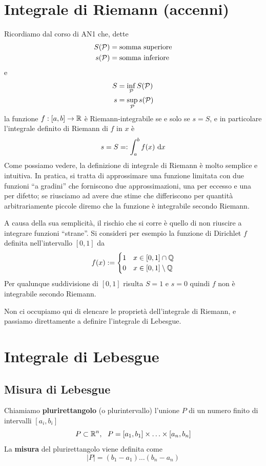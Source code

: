 \section{Integrale di Riemann (accenni)}

Ricordiamo dal corso di AN1 che, dette 
\begin{align*}
S(\mathcal{P})&=\text{somma superiore}\\
s(\mathcal{P})&=\text{somma inferiore}
\end{align*}
e
\begin{align*}
S&=\inf_{\mathcal{P}}S(\mathcal{P}) \\
s&=\sup_{\mathcal{P}}s(\mathcal{P})
\end{align*}
la funzione $f:[a,b]\to\mathbb{R}$ è Riemann-integrabile se e solo se $s=S$, e in particolare l'integrale definito di Riemann di $f$ in $x$ è
\begin{equation*}
s=S=:\int_{a}^{b}f(x)\  \mathrm{d} x
\end{equation*}
Come possiamo vedere, la definizione di integrale di Riemann è molto semplice e intuitiva. In pratica, si tratta di approssimare una funzione limitata con due funzioni ``a gradini'' che forniscono due approssimazioni, una per eccesso e una per difetto; se riusciamo ad avere due stime che differiscono per quantità arbitrariamente piccole diremo che la funzione è integrabile secondo Riemann.

A causa della sua semplicità, il rischio che si corre è quello di non riuscire a integrare funzioni ``strane''. Si consideri per esempio la funzione di Dirichlet $f$ definita nell'intervallo $[0,1]$ da
\begin{equation*}
f(x):=\begin{cases}
1 &x\in[0,1]\cap\mathbb{Q} \\
0 &x\in[0,1]\setminus\mathbb{Q}
\end{cases}
\end{equation*}
Per qualunque suddivisione di $[0,1]$ risulta $S=1$ e $s=0$ quindi $f$ non è integrabile secondo Riemann.

Non ci occupiamo qui di elencare le proprietà dell'integrale di Riemann, e passiamo direttamente a definire l'integrale di Lebesgue.

\section{Integrale di Lebesgue}

\subsection{Misura di Lebesgue}
Chiamiamo \textbf{plurirettangolo} (o plurintervallo) l'unione $P$ di un numero finito di intervalli $[a_i,b_i]$
\begin{equation*}
P\subset \mathbb{R}^{n}, \ \ P = [a_{1}, b_{1}] \times \dotsc \times [a_{n}, b_{n}]
\end{equation*}
La \textbf{misura} del plurirettangolo viene definita come
\begin{equation*}
|P| = (b_{1} - a_{1}) \dotsc (b_{n} - a_{n})
\end{equation*}

